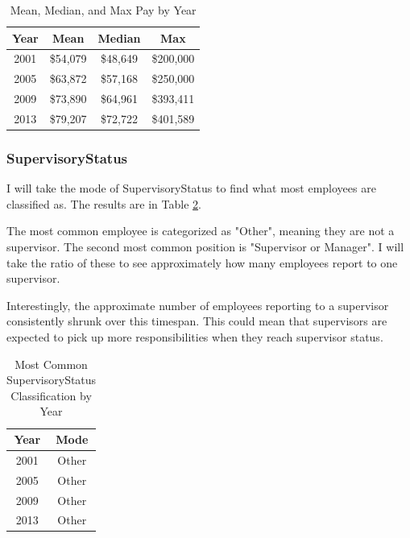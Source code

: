 \documentclass{article}
\begin{document}
            \begin{center}
                \begin{table}
                    \centering
                    \begin{tabular}{ |c|c|c|c| }
                        \hline
                        Year & Mean & Median & Max \\
                        \hline
                        2001 & \$54,079 & \$48,649 & \$200,000 \\
                        2005 & \$63,872 & \$57,168 & \$250,000 \\
                        2009 & \$73,890 & \$64,961 & \$393,411 \\
                        2013 & \$79,207 & \$72,722 & \$401,589 \\
                        \hline
                    \end{tabular}
                    \caption{Mean, Median, and Max Pay by Year}
                    \label{tab:11}
                \end{table}
            \end{center}

        \subsubsection{SupervisoryStatus}
        I will take the mode of SupervisoryStatus to find what most employees are classified as. The results are in Table \ref{tab:12}.
        \par
        The most common employee is categorized as "Other", meaning they are not a supervisor. The second most common position is "Supervisor or Manager". I will take the ratio of these to see approximately how many employees report to one supervisor.
        \par
        Interestingly, the approximate number of employees reporting to a supervisor consistently shrunk over this timespan. This could mean that supervisors are expected to pick up more responsibilities when they reach supervisor status.

            \begin{center}
                \begin{table}
                    \centering
                    \begin{tabular}{ |c|c| }
                        \hline
                        Year & Mode \\
                        \hline
                        2001 & Other \\
                        2005 & Other \\
                        2009 & Other \\
                        2013 & Other \\
                        \hline
                    \end{tabular}
                    \caption{Most Common SupervisoryStatus Classification by Year}
                    \label{tab:12}
                \end{table}
            \end{center}
\end{document}
